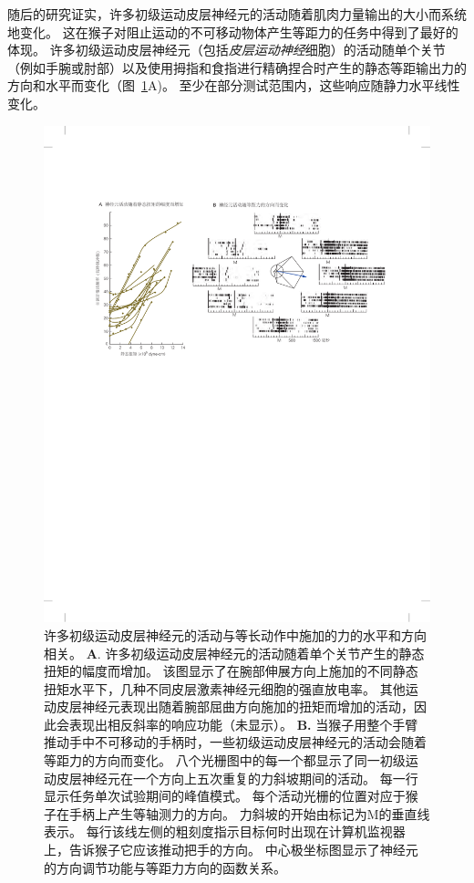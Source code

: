 随后的研究证实，许多初级运动皮层神经元的活动随着肌肉力量输出的大小而系统地变化。
这在猴子对阻止运动的不可移动物体产生等距力的任务中得到了最好的体现。
许多初级运动皮层神经元（包括\textit{皮层运动神经}细胞）的活动随单个关节（例如手腕或肘部）以及使用拇指和食指进行精确捏合时产生的静态等距输出力的方向和水平而变化（图~\ref{fig:34_19}A)。
至少在部分测试范围内，这些响应随静力水平线性变化。


\begin{figure}[htbp]
	\centering
	\includegraphics[width=1.0\linewidth]{chap34/fig_34_19}
	\caption{许多初级运动皮层神经元的活动与等长动作中施加的力的水平和方向相关。
		\textbf{A}. 许多初级运动皮层神经元的活动随着单个关节产生的静态扭矩的幅度而增加。
		该图显示了在腕部伸展方向上施加的不同静态扭矩水平下，几种不同皮层激素神经元细胞的强直放电率。
		其他运动皮层神经元表现出随着腕部屈曲方向施加的扭矩而增加的活动，因此会表现出相反斜率的响应功能（未显示）\cite{fetz1980postspike}。
		\textbf{B.} 当猴子用整个手臂推动手中不可移动的手柄时，一些初级运动皮层神经元的活动会随着等距力的方向而变化。
		八个光栅图中的每一个都显示了同一初级运动皮层神经元在一个方向上五次重复的力斜坡期间的活动。
		每一行显示任务单次试验期间的峰值模式。
		每个活动光栅的位置对应于猴子在手柄上产生等轴测力的方向。
		力斜坡的开始由标记为M的垂直线表示。
		每行该线左侧的粗刻度指示目标何时出现在计算机监视器上，告诉猴子它应该推动把手的方向。
		中心极坐标图显示了神经元的方向调节功能与等距力方向的函数关系\cite{sergio2003systematic}。}
	\label{fig:34_19}
\end{figure}



